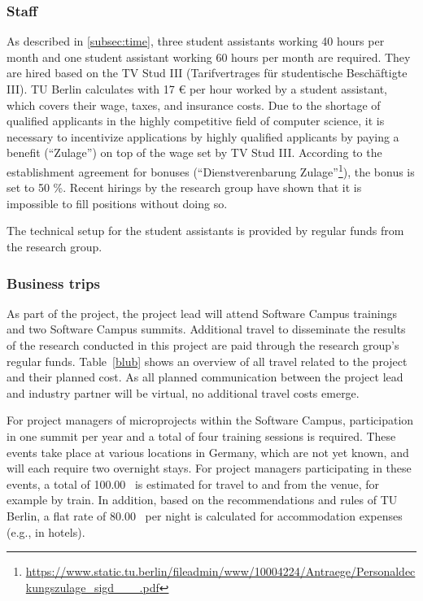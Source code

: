 \subsubsection{Staff}

As described in \cref{subsec:time}, three student assistants working 40 hours per month and one student assistant working 60 hours per month are required.
They are hired based on the TV Stud III (Tarifvertrages für studentische Beschäftigte III).
TU Berlin calculates with 17 € per hour worked by a student assistant, which covers their wage, taxes, and insurance costs.
Due to the shortage of qualified applicants in the highly competitive field of computer science, it is necessary to incentivize applications by highly qualified applicants by paying a benefit (\enquote{Zulage}) on top of the wage set by TV Stud III.
According to the establishment agreement for bonuses (\enquote{Dienstverenbarung Zulage}\footnote{\url{https://www.static.tu.berlin/fileadmin/www/10004224/Antraege/Personaldeckungszulage_sigd___.pdf}}), the bonus is set to 50 \%.
Recent hirings by the research group have shown that it is impossible to fill positions without doing so.

The technical setup for the student assistants is provided by regular funds from the research group.

\subsubsection{Business trips}

As part of the project, the project lead will attend Software Campus trainings and two Software Campus summits.
Additional travel to disseminate the results of the research conducted in this project are paid through the research group's regular funds.
Table~\ref{blub} shows an overview of all travel related to the project and their planned cost.
As all planned communication between the project lead and industry partner will be virtual, no additional travel costs emerge.

For project managers of microprojects within the Software Campus, participation in one summit per year and a total of four training sessions is required.
These events take place at various locations in Germany, which are not yet known, and will each require two overnight stays.
For project managers participating in these events, a total of 100.00~\texteuro{} is estimated for travel to and from the venue, for example by train.
In addition, based on the recommendations and rules of TU Berlin, a flat rate of 80.00~\texteuro{} per night is calculated for accommodation expenses (e.g., in hotels).

